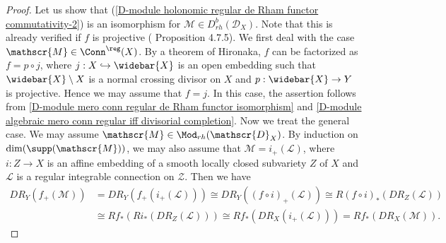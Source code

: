 \begin{proof}
Let us show that (\ref{D-module holonomic regular de Rham functor commutativity-2}) is an isomorphism for $\mathscr{M}\in D^b_{rh}(\mathscr{D}_X)$. Note that this is already verified if $f$ is projective (\cite{Hotta} Proposition 4.7.5). We first deal with the case $\mathscr{M}\in\Conn^{\reg}(X)$. By a theorem of Hironaka, $f$ can be factorized as $f=p\circ j$, where $j:X\hookrightarrow\widebar{X}$ is an open embedding such that $\widebar{X}\setminus X$ is a normal crossing divisor on $X$ and $p:\widebar{X}\to Y$ is projective. Hence we may assume that $f=j$. In this case, the assertion follows from \cref{D-module mero conn regular de Rham functor isomorphism} and \cref{D-module algebraic mero conn regular iff divisorial completion}. Now we treat the general case. We may assume $\mathscr{M}\in\Mod_{rh}(\mathscr{D}_X)$. By induction on $\dim(\supp(\mathscr{M}))$, we may also assume that $\mathscr{M}=i_+(\mathscr{L})$, where $i:Z\to X$ is an affine embedding of a smooth locally closed subvariety $Z$ of $X$ and $\mathscr{L}$ is a regular integrable connection on $\mathscr{Z}$. Then we have
\begin{align*}
DR_Y(f_+(\mathscr{M}))&=DR_Y(f_+(i_+(\mathscr{L})))\cong DR_Y((f\circ i)_+(\mathscr{L}))\cong R(f\circ i)_*(DR_Z(\mathscr{L}))\\
&\cong Rf_*(Ri_*(DR_Z(\mathscr{L})))\cong Rf_*(DR_X(i_+(\mathscr{L})))=Rf_*(DR_X(\mathscr{M})).
\end{align*}


\end{proof}
